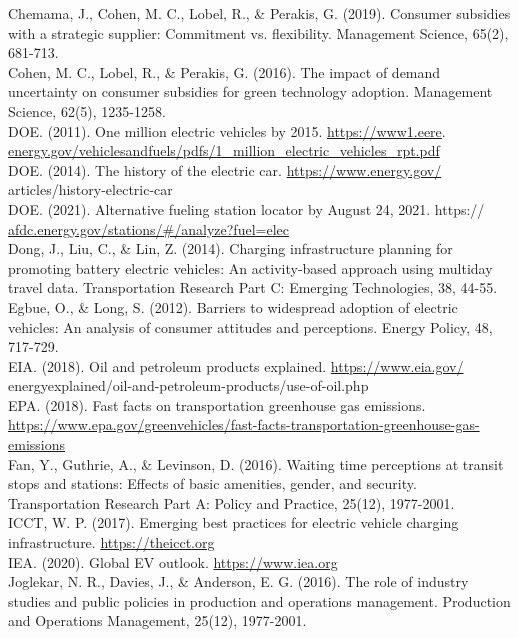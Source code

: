 \documentclass[10pt]{article}
\begin{document}
Chemama, J., Cohen, M. C., Lobel, R., \& Perakis, G. (2019). Consumer subsidies with a strategic supplier: Commitment vs. flexibility. Management Science, 65(2), 681-713.\\
Cohen, M. C., Lobel, R., \& Perakis, G. (2016). The impact of demand uncertainty on consumer subsidies for green technology adoption. Management Science, 62(5), 1235-1258.\\
DOE. (2011). One million electric vehicles by 2015. \href{https://www1.eere}{https://www1.eere}. \href{http://energy.gov/vehiclesandfuels/pdfs/1_million_electric_vehicles_rpt.pdf}{energy.gov/vehiclesandfuels/pdfs/1\_million\_electric\_vehicles\_rpt.pdf}\\
DOE. (2014). The history of the electric car. \href{https://www.energy.gov/}{https://www.energy.gov/} articles/history-electric-car\\
DOE. (2021). Alternative fueling station locator by August 24, 2021. https:// \href{http://afdc.energy.gov/stations/#/analyze?fuel=elec}{afdc.energy.gov/stations/\#/analyze?fuel=elec}\\
Dong, J., Liu, C., \& Lin, Z. (2014). Charging infrastructure planning for promoting battery electric vehicles: An activity-based approach using multiday travel data. Transportation Research Part C: Emerging Technologies, 38, 44-55.\\
Egbue, O., \& Long, S. (2012). Barriers to widespread adoption of electric vehicles: An analysis of consumer attitudes and perceptions. Energy Policy, 48, 717-729.\\
EIA. (2018). Oil and petroleum products explained. \href{https://www.eia.gov/}{https://www.eia.gov/} energyexplained/oil-and-petroleum-products/use-of-oil.php\\
EPA. (2018). Fast facts on transportation greenhouse gas emissions. \href{https://www.epa.gov/greenvehicles/fast-facts-transportation-greenhouse-gas-emissions}{https://www.epa.gov/greenvehicles/fast-facts-transportation-greenhouse-gas-emissions}\\
Fan, Y., Guthrie, A., \& Levinson, D. (2016). Waiting time perceptions at transit stops and stations: Effects of basic amenities, gender, and security. Transportation Research Part A: Policy and Practice, 25(12), 1977-2001.\\
ICCT, W. P. (2017). Emerging best practices for electric vehicle charging infrastructure. \href{https://theicct.org}{https://theicct.org}\\
IEA. (2020). Global EV outlook. \href{https://www.iea.org}{https://www.iea.org}\\
Joglekar, N. R., Davies, J., \& Anderson, E. G. (2016). The role of industry studies and public policies in production and operations management. Production and Operations Management, 25(12), 1977-2001.
\end{document}
